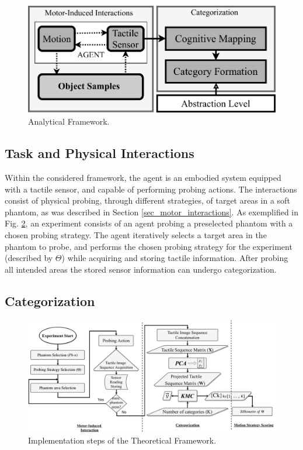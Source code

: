 \begin{figure}[]
	\centering
	\includegraphics[width=\columnwidth]{./figs/conceptual_framework}
	\caption{Analytical Framework.}
	\label{conceptual_map}
\end{figure}

\subsection{Task and Physical Interactions}\label{sec_int}
Within the considered framework, the agent is an embodied system equipped with a tactile sensor, and capable of performing probing actions. The interactions consist of physical probing, through different strategies, of target areas in a soft phantom, as was described in Section \ref{sec_motor_interactions}.
\color{black}
As exemplified in Fig. \ref{self_org_processing}, an experiment consists of an agent probing a preselected phantom 
with a chosen probing strategy. The agent iteratively selects a target area in the phantom to probe, and performs 
the chosen probing strategy for the experiment (described by $\Theta$) while acquiring and storing tactile 
information. After probing all intended areas the stored sensor information can undergo categorization.

\subsection{Categorization}\label{sec_categorization}

\begin{figure}[]
	\centering
	\includegraphics[width=.8\textwidth]{./figs/motion_primitive_preprocessing.pdf}
	\caption{Implementation steps of the Theoretical Framework.} %
	\label{self_org_processing}
\end{figure}

